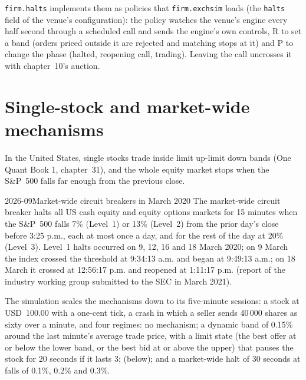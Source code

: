 \texttt{firm.halts} implements them as policies that \texttt{firm.exchsim} loads (the \texttt{halts} field of the venue's configuration): the policy
watches the venue's
engine every half second through a scheduled call and sends the engine's own controls, R to set a band (orders priced outside it are rejected and matching
stops at it) and P to change the phase (halted, reopening call, trading). Leaving the call uncrosses it with chapter~10's auction.

\label{lst:mx:circuit-breakers-and-halts:luld}

\section{Single-stock and market-wide mechanisms}

In the United States, single stocks trade inside limit up-limit down bands (One Quant Book 1, chapter~31), and the whole equity market stops when the
S\&P~500 falls far enough from the previous close.

\begin{dated}{2026-09}{Market-wide circuit breakers in March 2020}\label{dat:mx:circuit-breakers-and-halts:mwcb}
The market-wide circuit breaker halts all US cash equity and equity options markets for 15 minutes when the S\&P~500 falls 7\% (Level~1) or 13\%
(Level~2) from the prior day's close before 3:25 p.m., each at most once a day, and for the rest of the day at 20\% (Level~3). Level~1 halts occurred
on 9, 12, 16 and 18 March 2020; on 9 March the index crossed the threshold at 9:34:13 a.m. and  began at 9:49:13 a.m.; on 18 March it
crossed at 12:56:17 p.m. and reopened at 1:11:17 p.m. (report of the industry working group submitted to the SEC in March 2021).
\end{dated}

The simulation scales the mechanisms down to its five-minute sessions: a stock at USD~100.00 with a one-cent tick, a crash in which a seller sends
40\,000 shares as sixty  over a minute, and four regimes: no mechanism; a dynamic band of 0.15\% around the last minute's average trade
price, with a limit state (the best offer at or below the lower band, or the best bid at or above the upper) that pauses the stock for 20 seconds if it
lasts 3;  (below); and a market-wide halt of 30 seconds at falls of 0.1\%, 0.2\% and 0.3\%.

